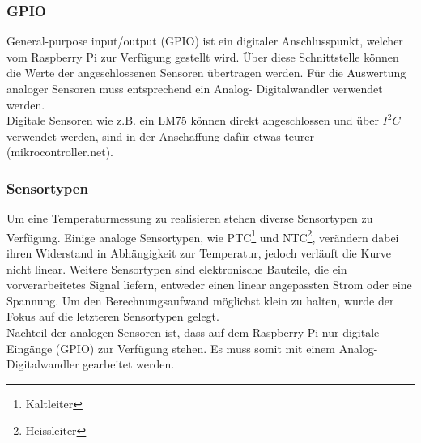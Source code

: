 \subsubsection{GPIO}
General-purpose input/output (GPIO) ist ein digitaler Anschlusspunkt, welcher vom Raspberry Pi zur Verfügung gestellt wird. Über diese Schnittstelle können die Werte der angeschlossenen Sensoren übertragen werden. Für die Auswertung analoger Sensoren muss entsprechend ein Analog- Digitalwandler verwendet werden.\\
Digitale Sensoren wie z.B. ein LM75 können direkt angeschlossen und über $I^2C$ verwendet werden, sind in der Anschaffung dafür etwas teurer (mikrocontroller.net).

\subsubsection{Sensortypen}
Um eine Temperaturmessung zu realisieren stehen diverse Sensortypen zu Verfügung. Einige analoge Sensortypen, wie PTC\footnote{Kaltleiter} und NTC\footnote{Heissleiter}, verändern dabei ihren Widerstand in Abhängigkeit zur Temperatur, jedoch verläuft die Kurve nicht linear. Weitere Sensortypen sind elektronische Bauteile, die ein vorverarbeitetes Signal liefern, entweder einen linear angepassten Strom oder eine Spannung. Um den Berechnungsaufwand möglichst klein zu halten, wurde der Fokus auf die letzteren Sensortypen gelegt.\\
Nachteil der analogen Sensoren ist, dass auf dem Raspberry Pi nur digitale Eingänge (GPIO) zur Verfügung stehen. Es muss somit  mit einem Analog- Digitalwandler gearbeitet werden.


